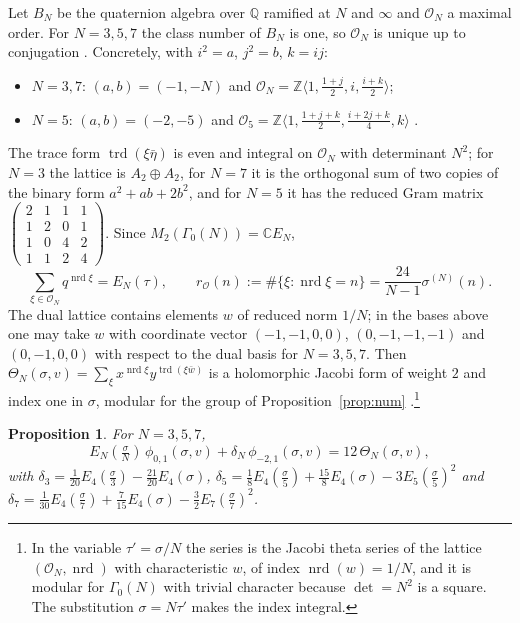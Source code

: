 \documentclass[mathematics,article,submit,pdftex,oneauthor]{Definitions/mdpi}
\numberwithin{equation}{section}
\theoremstyle{plain}
\newtheorem{prop}[thm]{Proposition}
\theoremstyle{remark}
\newcommand{\Z}{\mathbb{Z}}
\newcommand{\Q}{\mathbb{Q}}
\newcommand{\C}{\mathbb{C}}
\newcommand{\cO}{\mathcal{O}}
\newcommand{\pmi}{\phi_{-2,1}}
\newcommand{\pz}{\phi_{0,1}}
\begin{document}
Let $B_N$ be the quaternion algebra over $\Q$ ramified at $N$ and $\infty$ and $\cO_N$ a maximal order. For $N=3,5,7$ the class number of $B_N$ is one, so $\cO_N$ is unique up to conjugation \cite[Chapter~25]{Voi21}. Concretely, with $i^2=a$, $j^2=b$, $k=ij$:
\begin{itemize}
\item $N=3,7$: $(a,b)=(-1,-N)$ and $\cO_N=\Z\langle1,\tfrac{1+j}{2},i,\tfrac{i+k}{2}\rangle$;
\item $N=5$: $(a,b)=(-2,-5)$ and $\cO_5=\Z\langle1,\tfrac{1+j+k}{2},\tfrac{i+2j+k}{4},k\rangle$ \cite{Piz80}.
\end{itemize}
The trace form $\operatorname{trd}(\xi\bar\eta)$ is even and integral on $\cO_N$ with determinant $N^2$; for $N=3$ the lattice is $A_2\oplus A_2$, for $N=7$ it is the orthogonal sum of two copies of the binary form $a^2+ab+2b^2$, and for $N=5$ it has the reduced Gram matrix $\left(\begin{smallmatrix}2&1&1&1\\1&2&0&1\\1&0&4&2\\1&1&2&4\end{smallmatrix}\right)$. Since $M_2(\Gamma_0(N))=\C E_N$,
\begin{equation}\label{eq:rO}
\sum_{\xi\in\cO_N}q^{\operatorname{nrd}\xi}=E_N(\tau),\qquad r_{\cO}(n):=\#\{\xi:\operatorname{nrd}\xi=n\}=\frac{24}{N-1}\sigma^{(N)}(n).
\end{equation}
The dual lattice contains elements $w$ of reduced norm $1/N$; in the bases above one may take $w$ with coordinate vector $(-1,-1,0,0)$, $(0,-1,-1,-1)$ and $(0,-1,0,0)$ with respect to the dual basis for $N=3,5,7$. Then $\Theta_N(\sigma,v)=\sum_\xi x^{\operatorname{nrd}\xi}y^{\operatorname{trd}(\xi\bar w)}$ is a holomorphic Jacobi form of weight $2$ and index one in $\sigma$, modular for the group of Proposition~\ref{prop:num} \cite[\S7]{EZ85}.\footnote{In the variable $\tau'=\sigma/N$ the series is the Jacobi theta series of the lattice $(\cO_N,\operatorname{nrd})$ with characteristic $w$, of index $\operatorname{nrd}(w)=1/N$, and it is modular for $\Gamma_0(N)$ with trivial character because $\det=N^2$ is a square. The substitution $\sigma=N\tau'$ makes the index integral.}

\begin{prop}\label{prop:theta}
For $N=3,5,7$,
\begin{equation}\label{eq:theta}
E_N(\tfrac\sigma N)\,\pz(\sigma,v)+\delta_N\,\pmi(\sigma,v)=12\,\Theta_N(\sigma,v),
\end{equation}
with $\delta_3=\tfrac{1}{20}E_4(\tfrac\sigma3)-\tfrac{21}{20}E_4(\sigma)$, $\delta_5=\tfrac18E_4(\tfrac\sigma5)+\tfrac{15}8E_4(\sigma)-3E_5(\tfrac\sigma5)^2$ and $\delta_7=\tfrac1{30}E_4(\tfrac\sigma7)+\tfrac7{15}E_4(\sigma)-\tfrac32E_7(\tfrac\sigma7)^2$.
\end{prop}
\end{document}
